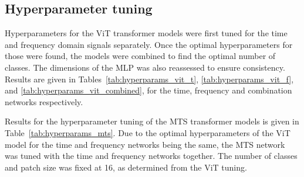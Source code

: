 \begin{appendices}
\section{Hyperparameter tuning}
\label{sec:apx:Hyperparameter_tuning}

Hyperparameters for the ViT transformer models were first tuned for the time and frequency domain signals separately. Once the optimal hyperparameters for those were found, the models were combined to find the optimal number of classes. The dimensions of the MLP was also reassessed to ensure consistency. Results are given in Tables~\ref{tab:hyperparams_vit_t}, \ref{tab:hyperparams_vit_f}, and \ref{tab:hyperparams_vit_combined}, for the time, frequency and combination networks respectively.

Results for the hyperparameter tuning of the MTS transformer models is given in Table~\ref{tab:hyperparams_mts}. Due to the optimal hyperparameters of the ViT model for the time and frequency networks being the same, the MTS network was tuned with the time and frequency networks together. The number of classes and patch size was fixed at 16, as determined from the ViT tuning.


\end{appendices}
